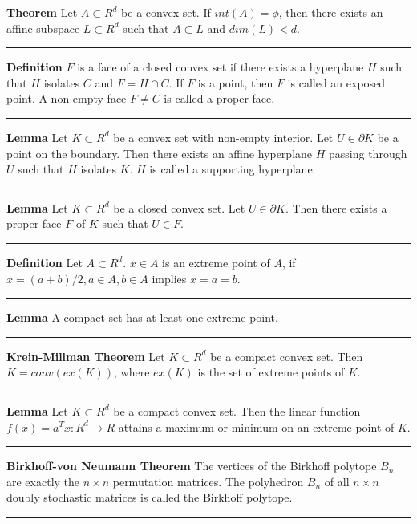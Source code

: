 \noindent
\textbf{Theorem} Let \(A \subset R^d\) be a convex set. If 
\(int(A) = \phi\), then there exists an affine subspace 
\(L \subset R^d\) such that \(A \subset L\) and \(dim(L) < d\).
\\
\rule{\linewidth}{0.1mm}

\noindent
\textbf{Definition} \(F\) is a face of a closed convex set if there 
exists a hyperplane \(H\) such that \(H\) isolates \(C\) and 
\(F = H \cap C\). If \(F\) is a point, then \(F\) is called an 
exposed point. A non-empty face \(F \ne C\) is called a proper face.
\\
\rule{\linewidth}{0.1mm}

\noindent
\textbf{Lemma} Let \(K \subset R^d\) be a convex set with non-empty 
interior. Let \(U \in \partial K\) be a point on the boundary. 
Then there exists an 
affine hyperplane \(H\) passing through \(U\) such that \(H\) isolates 
\(K\). \(H\) is called a supporting hyperplane.
\\
\rule{\linewidth}{0.1mm}

\noindent
\textbf{Lemma} Let \(K \subset R^d\) be a closed convex set. Let 
\(U \in \partial K\). Then there exists a proper face \(F\) of \(K\) 
such that \(U \in F\).
\\
\rule{\linewidth}{0.1mm}

\noindent
\textbf{Definition} Let \(A \subset R^d\). \(x \in A\) is an extreme 
point of \(A\), if \(x = (a+b)/2, a \in A,b \in A\) implies 
\(x = a = b\).
\\
\rule{\linewidth}{0.1mm}

\noindent
\textbf{Lemma} A compact set has at least one extreme point.
\\
\rule{\linewidth}{0.1mm}

\noindent
\textbf{Krein-Millman Theorem} Let \(K \subset R^d\) be a compact 
convex set. Then \(K = conv(ex(K))\), where \(ex(K)\) is the set of 
extreme points of \(K\).
\\
\rule{\linewidth}{0.1mm}

\noindent
\textbf{Lemma} Let \(K \subset R^d\) be a compact convex set. Then the 
linear function \(f(x) = a^T x :R^d \rightarrow R\) attains a maximum 
or minimum on an extreme point of \(K\).
\\
\rule{\linewidth}{0.1mm}

\noindent
\textbf{Birkhoff-von Neumann Theorem} The vertices of the Birkhoff 
polytope \(B_n\) are exactly the \(n \times n\) permutation matrices. 
The polyhedron \(B_n\) of all \(n \times n\) doubly stochastic matrices 
is called the Birkhoff polytope.
\\
\rule{\linewidth}{0.1mm}


